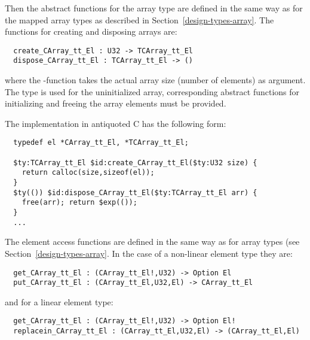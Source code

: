 Then the abstract functions for the array type are defined in the same way as for the mapped array types as described in
Section~\ref{design-types-array}. The functions for creating and disposing arrays are:
\begin{verbatim}
  create_CArray_tt_El : U32 -> TCArray_tt_El
  dispose_CArray_tt_El : TCArray_tt_El -> ()
\end{verbatim}
where the -function takes the actual array size (number of elements) as argument. The type 
 is used for the uninitialized array, corresponding abstract functions for initializing
and freeing the array elements must be provided.

The implementation in antiquoted C has the following form:
\begin{verbatim}
  typedef el *CArray_tt_El, *TCArray_tt_El;
  
  $ty:TCArray_tt_El $id:create_CArray_tt_El($ty:U32 size) { 
    return calloc(size,sizeof(el));
  }
  $ty(()) $id:dispose_CArray_tt_El($ty:TCArray_tt_El arr) {
    free(arr); return $exp(());
  }
  ...
\end{verbatim}

The element access functions are defined in the same way as for array types (see Section~\ref{design-types-array}. 
In the case of a non-linear element type they are:
\begin{verbatim}
  get_CArray_tt_El : (CArray_tt_El!,U32) -> Option El
  put_CArray_tt_El : (CArray_tt_El,U32,El) -> CArray_tt_El
\end{verbatim}
and for a linear element type:
\begin{verbatim}
  get_CArray_tt_El : (CArray_tt_El!,U32) -> Option El!
  replacein_CArray_tt_El : (CArray_tt_El,U32,El) -> (CArray_tt_El,El)
\end{verbatim}

